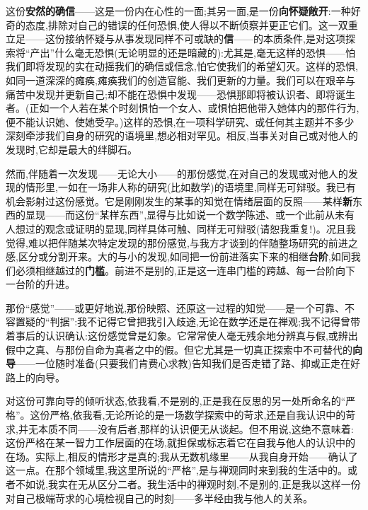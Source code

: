 这份\textbf{安然的确信}——这是一份内在心性的一面;其另一面,是一份\textbf{向怀疑敞开}:一种好奇的态度,排除对自己的错误的任何恐惧,使人得以不断侦察并更正它们。这一双重立足——这份接纳怀疑与从事发现同样不可或缺的\textbf{信}——的本质条件,是对这项探索将“产出”什么毫无恐惧(无论明显的\dmark{}还是暗藏的):尤其是,毫无这样的恐惧——怕我们即将发现的实在动摇我们的确信或信念,怕它使我们的希望幻灭。这样的恐惧,如同一道深深的瘫痪,瘫痪我们的创造官能、我们更新的力量。我们可以在艰辛与痛苦中发现并更新自己;却不能在恐惧中发现——恐惧那即将被认识者、即将诞生者。(正如一个人若在某个时刻惧怕一个女人、或惧怕把他带入她体内的那件行为,便不能认识她、使她受孕。)这样的恐惧,在一项科学研究、或任何其主题并不多少深刻牵涉我们自身的研究的语境里,想必相对罕见。相反,当事关对自己或对他人的发现时,它却是最大的绊脚石。

然而,伴随着一次发现——无论大小——的那份感觉,在对自己的发现或对他人的发现的情形里,一如在一场非人称的研究(比如数学)的语境里,同样无可辩驳。我已有机会影射过这份感觉。它是刚刚发生的某事的知觉在情绪层面的反照——某样\textbf{新}东西的显现——而这份“某样东西”,显得与比如说一个数学陈述、或一个此前从未有人想过的观念或证明的显现,同样具体可触、同样无可辩驳(请恕我重复!)。况且我觉得,难以把伴随某次特定发现的那份感觉,与我方才谈到的伴随整场研究的前进之感,区分或分割开来。大的与小的发现,如同把一份前进落实下来的相继\textbf{台阶},如同我们必须相继越过的\textbf{门槛}。前进不是别的,正是这一连串门槛的跨越、每一台阶向下一台阶的升进。

那份“感觉”——或更好地说,那份映照、还原这一过程的知觉——是一个可靠、不容置疑的“判据”:我不记得它曾把我引入歧途,无论在数学还是在禅观;我不记得曾带着事后的认识确认:这份感觉曾是幻象。它常常使人毫无残余地分辨真与假,或辨出假中之真、与那份自命为真者之中的假。但它尤其是一切真正探索中不可替代的\textbf{向导}——一位随时准备(只要我们肯费心求教)告知我们是否走错了路、抑或正走在好路上的向导。

对这份可靠向导的倾听状态,依我看,不是别的,正是我在反思的另一处所命名的“严格”。这份严格,依我看,无论所论的是一场数学探索中的苛求,还是自我认识中的苛求,并无本质不同——没有后者,那样的认识便无从谈起。但不用说,这绝不意味着:这份严格在某一智力工作层面的在场,就担保或标志着它在自我与他人的认识中的在场。实际上,相反的情形才是真的;我从无数机缘里——从我自身开始——确认了这一点。在那个领域里,我这里所说的“严格”,是与禅观同时来到我的生活中的。或者不如说,我实在无从区分二者。我生活中的禅观时刻,不是别的,正是我以这样一份对自己极端苛求的心境检视自己的时刻——多半经由我与他人的关系。
